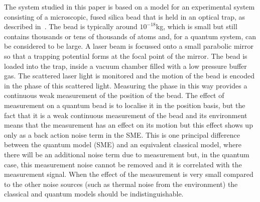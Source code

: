 \documentclass[conference]{IEEEtran}
\begin{document}
The system studied in this paper is based on a model for an experimental system consisting of a microscopic, fused silica bead that is held in an optical trap, as described in~\cite{Ash1970,Man1998,Gan1999,Vul2000,Mud2016,Set2018}. The bead is typically around $10^{-18}$kg, which is small but still contains thousands or tens of thousands of atoms and, for a quantum system, can be considered to be large. A laser beam is focussed onto a small parabolic mirror so that a trapping potential forms at the focal point of the mirror. The bead is loaded into the trap, inside a vacuum chamber filled with a low pressure buffer gas. The scattered laser light is monitored and the motion of the bead is encoded in the phase of this scattered light. Measuring the phase in this way provides a continuous weak measurement of the position of the bead. The effect of measurement on a quantum bead is to localise it in the position basis, but the fact that it is a weak continuous measurement of the bead and its environment means that the measurement has an effect on its motion but this effect shows up only as a back action noise term in the SME. This is one principal difference between the quantum model (SME) and an equivalent classical model, where there will be an additional noise term due to measurement but, in the quantum case, this measurement noise cannot be removed and it is correlated with the measurement signal. When the effect of the measurement is very small compared to the other noise sources (such as thermal noise from the environment) the classical and quantum models should be indistinguishable. 
\end{document}
